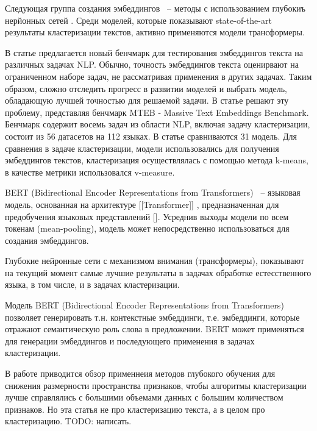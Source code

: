 Следующая группа создания эмбеддингов ~-- методы с использованием глубокиъ нерйонных сетей \cite{no-patterns}. Среди моделей, которые показывают state-of-the-art результаты кластеризации текстов, активно применяются модели трансформеры.

В статье \cite{mteb} предлагается новый бенчмарк для тестирования эмбеддингов текста на различных задачах NLP. Обычно, точность эмбеддингов текста оценирвают на ограниченном наборе задач, не рассматривая применения в других задачах. Таким образом, сложно отследить прогресс в развитии моделей и выбрать модель, обладающую лучшей  точностью для решаемой задачи. В статье решают эту проблему, представляя бенчмарк MTEB - Massive Text Embeddings Benchmark. Бенчмарк содержит восемь задач из области NLP, включая задачу кластеризации, состоит из 56 датасетов на 112 языках. В статье сравниваются 31 модель. Для сравнения в задаче кластеризации, модели использовались для получения эмбеддингов текстов, кластеризация осуществлялась с помощью метода k-means, в качестве метрики использовался v-measure.

BERT (Bidirectional Encoder Representations from Transformers) ~-- языковая модель, основанная на архитектуре [[Transformer]] , предназначенная для предобучения языковых представлений [\cite{bert}]. Усреднив выходы модели по всем токенам (mean-pooling), модель может непосредственно использоваться для создания эмбеддингов.

Глубокие нейронные сети с механизмом внимания (трансформеры), показывают на текущий момент самые лучшие результаты в задачах обработке естесственного языка, в том числе, и в задачах кластеризации.

Модель BERT (Bidirectional Encoder Representations from Transformers) позволяет генерировать т.н. контекстные эмбеддинги, т.е. эмбеддинги, которые отражают семантическую роль слова в предложении. BERT может применяться для генерации эмбеддингов и последующего применения в задачах кластеризации. \cite{text-clustering-with-bert}

В работе \cite{deep-clustering-survey} приводится обзор применнеия методов глубокого обучения для снижения размерности пространства признаков, чтобы алгоритмы кластеризации лучше справлялись с большими объемами данных с большим количеством признаков. Но эта статья не про кластеризацию текста, а в целом про кластеризацию. TODO: написать.

